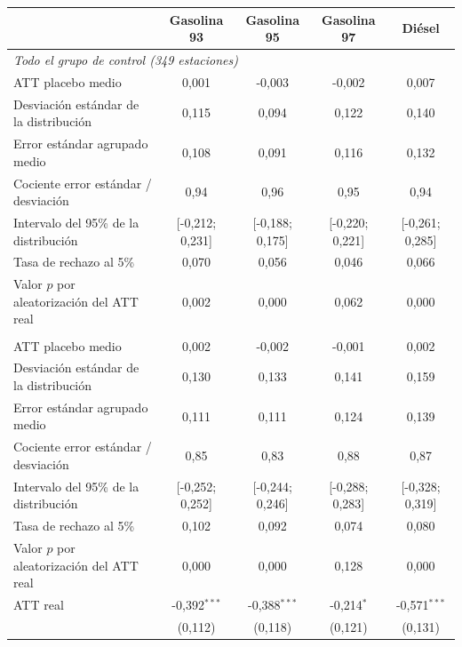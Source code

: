 \begin{tabular}{lcccc}
\toprule
 & Gasolina 93 & Gasolina 95 & Gasolina 97 & Diésel \\
\midrule
\multicolumn{5}{l}{\emph{Todo el grupo de control (349 estaciones)}} \\
\quad ATT placebo medio & 0{,}001 & -0{,}003 & -0{,}002 & 0{,}007 \\
\quad Desviación estándar de la distribución & 0{,}115 & 0{,}094 & 0{,}122 & 0{,}140 \\
\quad Error estándar agrupado medio & 0{,}108 & 0{,}091 & 0{,}116 & 0{,}132 \\
\quad Cociente error estándar / desviación & 0{,}94 & 0{,}96 & 0{,}95 & 0{,}94 \\
\quad Intervalo del 95\% de la distribución & [-0{,}212; 0{,}231] & [-0{,}188; 0{,}175] & [-0{,}220; 0{,}221] & [-0{,}261; 0{,}285] \\
\quad Tasa de rechazo al 5\% & 0{,}070 & 0{,}056 & 0{,}046 & 0{,}066 \\
\quad Valor $p$ por aleatorización del ATT real & 0{,}002 & 0{,}000 & 0{,}062 & 0{,}000 \\
\addlinespace
\multicolumn{5}{l}{\emph{Mitad más densa del grupo de control (175 estaciones)}} \\
\quad ATT placebo medio & 0{,}002 & -0{,}002 & -0{,}001 & 0{,}002 \\
\quad Desviación estándar de la distribución & 0{,}130 & 0{,}133 & 0{,}141 & 0{,}159 \\
\quad Error estándar agrupado medio & 0{,}111 & 0{,}111 & 0{,}124 & 0{,}139 \\
\quad Cociente error estándar / desviación & 0{,}85 & 0{,}83 & 0{,}88 & 0{,}87 \\
\quad Intervalo del 95\% de la distribución & [-0{,}252; 0{,}252] & [-0{,}244; 0{,}246] & [-0{,}288; 0{,}283] & [-0{,}328; 0{,}319] \\
\quad Tasa de rechazo al 5\% & 0{,}102 & 0{,}092 & 0{,}074 & 0{,}080 \\
\quad Valor $p$ por aleatorización del ATT real & 0{,}000 & 0{,}000 & 0{,}128 & 0{,}000 \\
\addlinespace
\midrule
ATT real & -0{,}392$^{***}$ & -0{,}388$^{***}$ & -0{,}214$^{*}$ & -0{,}571$^{***}$ \\
 & (0{,}112) & (0{,}118) & (0{,}121) & (0{,}131) \\
\bottomrule
\end{tabular}
